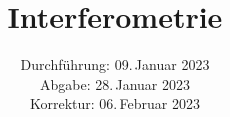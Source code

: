 

\subject{V64}
\title{Interferometrie}
\date{%
  Durchführung: 09.\,Januar 2023
  \\
  Abgabe: 28.\,Januar 2023
  \\
  Korrektur: 06.\,Februar 2023
}



\maketitle
\thispagestyle{empty}
\tableofcontents
\newpage







\newpage
\printbibliography{}


